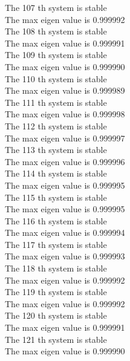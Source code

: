 \documentclass[11pt]{article}
\begin{document}
The 107 th system is stable \\
The max eigen value is 0.999992 \\
The 108 th system is stable \\
The max eigen value is 0.999991 \\
The 109 th system is stable \\
The max eigen value is 0.999990 \\
The 110 th system is stable \\
The max eigen value is 0.999989 \\
The 111 th system is stable \\
The max eigen value is 0.999998 \\
The 112 th system is stable \\
The max eigen value is 0.999997 \\
The 113 th system is stable \\
The max eigen value is 0.999996 \\
The 114 th system is stable \\
The max eigen value is 0.999995 \\
The 115 th system is stable \\
The max eigen value is 0.999995 \\
The 116 th system is stable \\
The max eigen value is 0.999994 \\
The 117 th system is stable \\
The max eigen value is 0.999993 \\
The 118 th system is stable \\
The max eigen value is 0.999992 \\
The 119 th system is stable \\
The max eigen value is 0.999992 \\
The 120 th system is stable \\
The max eigen value is 0.999991 \\
The 121 th system is stable \\
The max eigen value is 0.999990 \\

\newpage
\end{document}
